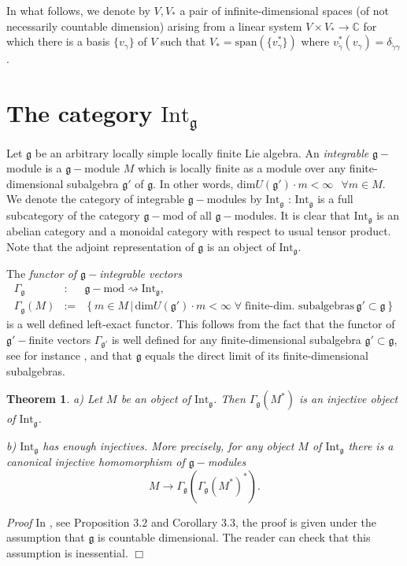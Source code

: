 \documentclass{svmult}
\newtheorem{theo}{Theorem}[section]
\renewenvironment{proof}{ \emph{Proof}}{$\Box$}
\newcommand {\CC} {\mathbb {C}}
\renewcommand{\gg}{\mathfrak{g}}
\begin{document}
\vspace{0.33cm}

In what follows, we denote by $V, V_*$ a pair of infinite-dimensional spaces (of not necessarily countable dimension) arising from a linear system $V \times V_* \rightarrow \CC$ for which there is a basis $\lbrace v_{\gamma}\rbrace$ of $V$ such that $V_* = \mathrm{span}(\lbrace v_{\gamma}^* \rbrace)$ where $v^*_{\tilde\gamma}(v_\gamma) = \delta_{\tilde\gamma \gamma}$.

\section{The category $\mathrm{Int}_{\gg}$}\label{sect:2} 

Let $\gg$ be an arbitrary locally simple locally finite Lie algebra. An \textit{integrable} $\gg-$module is a $\gg-$module 
$M$ which is locally finite as a module over any finite-dimensional subalgebra $\gg'$ of $\gg$. In other words, $\mathrm{dim}U(\gg')\cdot m < \infty\;\;\, \forall m \in M$. We denote the category of integrable $\gg-$modules by $\mathrm{Int}_{\gg}$ : $\mathrm{Int}_{\gg}$ is a full subcategory of the category $\gg-$mod of all $\gg-$modules. It is clear that $\mathrm{Int}_{\gg}$ is an abelian category and a monoidal category with respect to usual tensor product. Note that the adjoint representation of $\gg$ is an object of $\mathrm{Int}_{\gg}$.

The \textit{functor of $\gg-$integrable vectors}
\begin{eqnarray}\label{func_int_vec}
 \Gamma_{\gg} &:& \gg-\mathrm{mod} \rightsquigarrow \mathrm{Int}_{\gg},\nonumber\\
\Gamma_{\gg}(M) &:=& \left\lbrace m \in M\, | \,\mathrm{dim}U(\gg')\cdot m < \infty\; \forall\; \text{finite-dim. subalgebras}\, \gg'\subset \gg\right\rbrace \nonumber
\end{eqnarray}
is a well defined left-exact functor. This follows from the fact that the functor of $\gg'-$finite vectors $\Gamma_{\gg'}$ is well defined for any finite-dimensional subalgebra $\gg' \subset \gg$, see for instance \cite{Z}, and that $\gg$ equals the direct limit of its finite-dimensional subalgebras. 

\begin{theo}\label{int1}
a) Let $M$ be an object of $\mathrm{Int}_{\gg}$. Then $\Gamma_{\gg}(M^*)$ is an injective object of $\mathrm{Int}_{\gg}$.

b) $\mathrm{Int}_{\gg}$ has enough injectives. More precisely, for any object $M$ of $\mathrm{Int}_{\gg}$ there is a canonical injective homomorphism of $\gg-$modules
\begin{equation}\label{can_inj_hom}
 M \rightarrow \Gamma_{\gg} (\Gamma_{\gg}(M^*)^*).\nonumber
\end{equation}
\end{theo}
\begin{proof} In \cite{ps}, see Proposition $3.2$ and Corollary $3.3$, the proof is given under the assumption that $\gg$ is countable dimensional. The reader can check that this assumption is inessential.
\end{proof}
\end{document}
